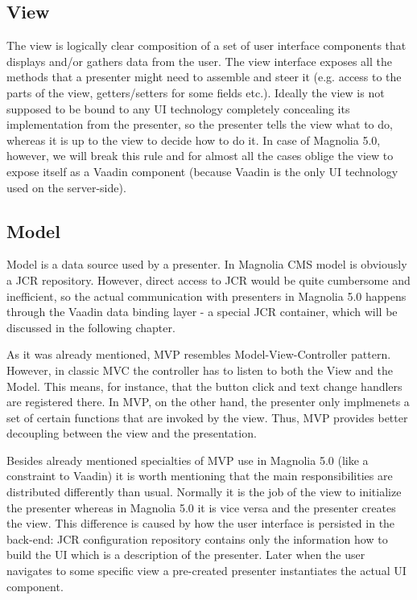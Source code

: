 \subsection{View} The view is logically clear composition of a set of user interface components that displays and/or gathers data
from the user. The view interface exposes all the methods that a presenter might need to assemble and steer it (e.g.
access to the parts of the view, getters/setters for some fields etc.). Ideally the view is not supposed to be bound to
any UI technology completely concealing its implementation from the presenter, so the presenter tells the view what to
do, whereas it is up to the view to decide how to do it. In case of Magnolia 5.0, however, we will break this rule and
for almost all the cases oblige the view to expose itself as a Vaadin component (because Vaadin is the only UI
technology used on the server-side).

\subsection{Model} Model is a data source used by a presenter. In Magnolia
CMS model is obviously a JCR repository. However, direct
access to JCR would be quite cumbersome and inefficient, so the actual communication with presenters in Magnolia 5.0
happens through the Vaadin data binding layer - a special JCR container, which will be discussed in the following chapter.

As it was already mentioned, MVP resembles Model-View-Controller pattern. However, in classic MVC the controller has to 
listen to both the View and the Model. This means, for instance, that the button click and text change handlers are registered
there. In MVP, on the other hand, the presenter only implmenets a set of certain functions that are invoked by the view.
Thus, MVP provides better decoupling between the view and the presentation. 

Besides already mentioned specialties of MVP use in Magnolia 5.0 (like a constraint to Vaadin) it is worth mentioning
that the main responsibilities are distributed differently than usual. Normally it is the job of the view to initialize
the presenter whereas in Magnolia 5.0 it is vice versa and the presenter creates the view. This difference is caused by
how the user interface is persisted in the back-end: JCR configuration repository contains only the information how to
build the UI which is a description of the presenter. Later when the user navigates to some specific view a pre-created
presenter instantiates the actual UI component.